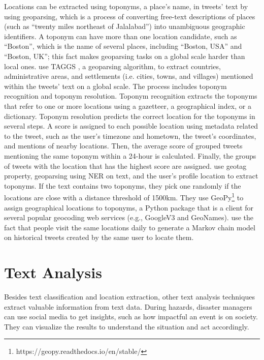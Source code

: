 Locations can be extracted using toponyms, a place's name, in tweets' text by using geoparsing,
which is a process of converting free-text descriptions of places (such as ``twenty miles northeast
of Jalalabad'') into unambiguous geographic identifiers. A toponym can have more than one location
candidate, such as ``Boston'', which is the name of several places, including ``Boston, USA'' and
``Boston, UK''; this fact makes geoparsing tasks on a global scale harder than local ones.
 use TAGGS \cite{debruijnTAGGSGroupingTweets2017}, a
geoparsing algorithm, to extract countries, administrative areas, and settlements (i.e. cities,
towns, and villages) mentioned within the tweets' text on a global scale. The process includes
toponym recognition and toponym resolution. Toponym recognition extracts the toponyms that refer to
one or more locations using a gazetteer, a geographical index, or a dictionary. Toponym resolution
predicts the correct location for the toponyms in several steps. A score is assigned to each
possible location using metadata related to the tweet, such as the user's timezone and hometown, the
tweet's coordinates, and mentions of nearby locations. Then, the average score of grouped tweets
mentioning the same toponym within a 24-hour is calculated. Finally, the groups of tweets with the
location that has the highest score are assigned.
 use geotag property, geoparsing using
\ac{NER} on text, and the user's profile location to extract toponyms. If the text contains two
toponyms, they pick one randomly if the locations are close with a distance threshold of 1500km.
They use GeoPy\footnote{https://geopy.readthedocs.io/en/stable/} to assign geographical locations to
toponyms, a Python package that is a client for several popular geocoding web services (e.g.,
GoogleV3 and GeoNames).  use the fact that people
visit the same locations daily to generate a Markov chain model on historical tweets created by the
same user to locate them. 

\section{Text Analysis}

Besides text classification and location extraction, other text analysis techniques extract valuable
information from text data. During hazards, disaster managers can use social media to get insights,
such as how impactful an event is on society. They can visualize the results to understand the
situation and act accordingly. 

